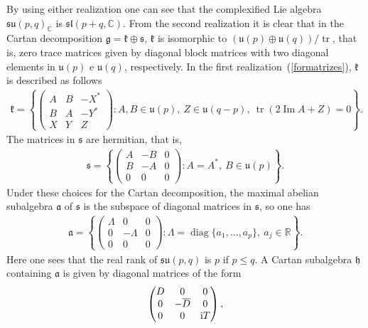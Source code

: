 \documentclass[pdftex]{sigma}
\numberwithin{equation}{section}
\newcommand{\func}[1]{\operatorname{#1}}
\begin{document}
By using either realization one can see that the complexified Lie algebra $\mathfrak{su}(p,q) _{\mathbb{C}}$ is $\mathfrak{sl} ( p+q,\mathbb{C} ) $. From the second realization it is clear that in the Cartan decomposition $\mathfrak{g}=\mathfrak{k}\oplus \mathfrak{s}$, $\mathfrak{k}$ is isomorphic to $( \mathfrak{u}(p) \oplus \mathfrak{u}(q)) /\operatorname{tr}$, that is, zero trace matrices given by diagonal block matrices with two diagonal elements in $\mathfrak{u}(p) $ e $\mathfrak{u}(q) $, respectively. In the first realization~(\ref{formatrizes}), $\mathfrak{k}$ is described as follows
\begin{gather*}
\mathfrak{k}=\left\{\left(
\begin{matrix}
A & B & -X^{\ast } \\
B & A & -Y^{\ast } \\
X & Y & Z%
\end{matrix}
\right) \colon A,B\in \mathfrak{u}(p), \ Z\in \mathfrak{u} ( q-p), \ \func{tr}(2\func{Im}A+Z)=0\right\}.
\end{gather*}%
The matrices in $\mathfrak{s}$ are hermitian, that is,
\begin{gather*}
\mathfrak{s}=\left\{\left(
\begin{matrix}
A & -B & 0 \\
B & -A & 0 \\
0 & 0 & 0%
\end{matrix}
\right) \colon A=A^{\ast }, \ B\in \mathfrak{u}(p) \right\}.
\end{gather*}%
Under these choices for the Cartan decomposition, the maximal abelian subalgebra $\mathfrak{a}$ of $\mathfrak{s}$ is the subspace of diagonal matrices in $\mathfrak{s}$, so one has
\begin{gather*}
\mathfrak{a}=\left\{\left(
\begin{matrix}
\Lambda & 0 & 0 \\
0 & -\Lambda & 0 \\
0 & 0 & 0%
\end{matrix}
\right) \colon \Lambda =\operatorname{diag}\{a_{1},\ldots,a_{p}\},\ a_{j}\in \mathbb{R}\right\}.
\end{gather*}
Here one sees that the real rank of $\mathfrak{su}(p,q) $ is $p$ if $p\leq q$. A Cartan subalgebra $\mathfrak{h}$ containing $\mathfrak{a}$ is given by diagonal matrices of the form
\begin{gather*}
\left(
\begin{matrix}
D & 0 & 0 \\
0 & -\overline{D} & 0 \\
0 & 0 & {\rm i}T
\end{matrix}
\right),
\end{gather*}
\end{document}
